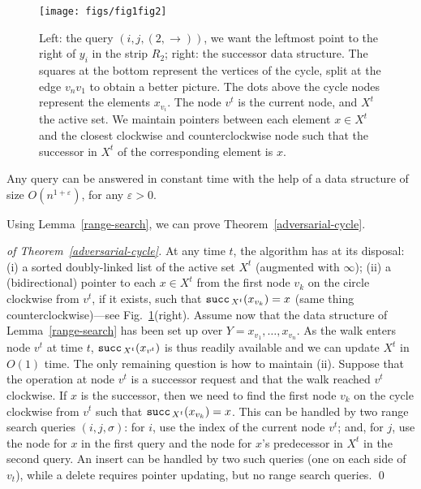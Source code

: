 \documentclass[oribibl,envcountsect,envcountsame]{llncs}
\begin{document}
\begin{figure}
\begin{center}
\texttt{[image: figs/fig1fig2]}
\end{center}
\caption{Left: the query  $(i,j, (2,\rightarrow))$, we want the leftmost
  point to the right of $y_i$ in the strip $R_2$;
 right: 
the successor data structure. The squares at the bottom 
represent the vertices of the cycle, split at the edge $v_nv_1$
to obtain a better picture. The dots above the cycle nodes represent
the elements $x_{v_i}$. 
The node $v^t$ is the current node, and $X^t$ the active set. We maintain
pointers between each element $x \in X^t$ and the closest clockwise and
counterclockwise node such that the successor in $X^t$ of the corresponding
element is $x$.}
\label{fig:fig12}
\end{figure}



\begin{lemma}\label{range-search}
Any query can be answered in constant time
with the help of a data structure of size $O(n^{1+\varepsilon})$,
for any $\varepsilon >0$.
\end{lemma}


\noindent
Using Lemma~\ref{range-search}, we can prove 
Theorem~\ref{adversarial-cycle}.
\begin{proof}[of Theorem~\ref{adversarial-cycle}]
At any time $t$, the algorithm has at its disposal:
(i) a sorted doubly-linked list of the active set $X^t$ 
(augmented with $\infty$);
(ii) a (bidirectional) pointer to each $x\in X^t$ from
the first node $v_k$ on the circle clockwise from $v^t$, if
it exists, such that ${\tt succ}_{\,X^t}(x_{v_k})= x$
(same thing counterclockwise)---see Fig.~\ref{fig:fig12}(right).
Assume now that the data structure of Lemma~\ref{range-search} has been
set up over $Y =  x_{v_1},\ldots, x_{v_n}$.
As the walk enters node $v^t$ at time $t$, ${\tt succ}_{\,X^t}(x_{v^t})$
is thus readily available and we can update $X^t$ in $O(1)$ time.
The only remaining question is how to maintain (ii). 
Suppose that the operation at node $v^t$ is a successor request
and that the walk reached $v^t$ clockwise.
If $x$ is the successor, then 
we need to find the first node $v_k$ on the cycle clockwise from $v^t$ 
such that ${\tt succ}_{\,X^t}(x_{v_k})= x$.
This can be handled by two range search queries $(i,j,\sigma)$:
for $i$, use the index of the current node $v^t$; and, for $j$, 
use the node for $x$ in the first query and the node for $x$'s 
predecessor in $X^t$ in the second query.
An insert can be handled by two such queries (one on each side of $v_t$),
while a delete requires pointer updating, but no range search queries.
\qed\end{proof}
\end{document}
